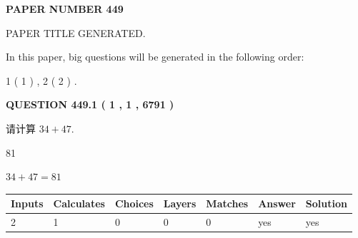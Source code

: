 \documentclass{ctexart}
\begin{document}
   
 {\textbf{ \Large{ PAPER NUMBER  449  }}}
   
   
\vspace{0.2in}
   
   
   
   
   
   
   
   
 \vspace{0.2in}
 
 
 
 
   
   
 PAPER TITLE GENERATED.
   
   
   
\vspace{0.2in}
   
In this paper, big questions will be generated in the following order: 
   
   
   1 ( 1 )
 ,
   2 ( 2 )
 .
  
\vspace{0.2in}
  
{\textbf{\Large{QUESTION
449.1 
 ( 1 , 1 , 6791 )
}}}
  
  
 
请计算 $ %
34 +  %
47 $.
 
 
 
\noindent{}
 
 

81
 
 
\noindent{}
 
 

 
 
 
\noindent{}
 
 

$ %
34 +  %
47=   %
81$
 
 
\noindent{}
 
 

 
   
   
   
   
\noindent\begin{tabular}{|l|l|l|l|l|l|l|}
 \hline
Inputs & Calculates & Choices & Layers & Matches & Answer & Solution \\ \hline
 2  & 
 1  & 
 0
  & 
 0  & 
 0  & 
  yes & 
  yes 
  \\ \hline
 \end{tabular}
   
\end{document}
